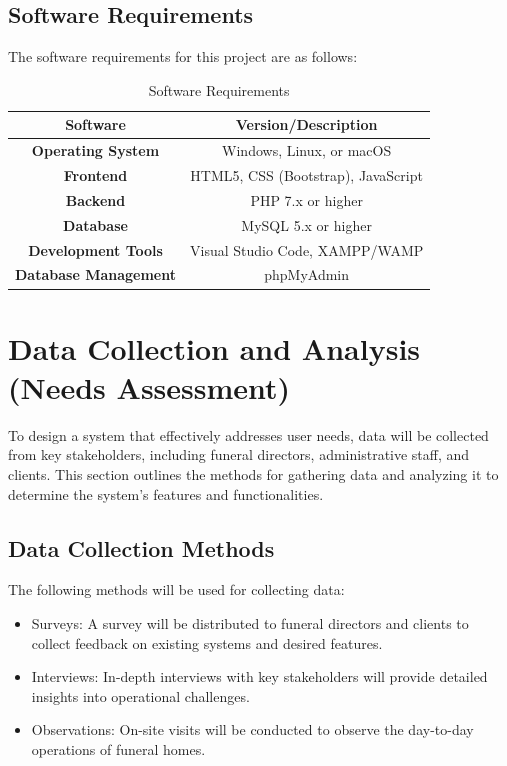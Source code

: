 \documentclass[a4paper,12pt]{report}
\begin{document}
\subsection{Software Requirements}
The software requirements for this project are as follows:
\begin{table}[ht]
\centering
\begin{tabular}{|c|c|}
\hline
\textbf{Software} & \textbf{Version/Description} \\
\hline
\textbf{Operating System} & Windows, Linux, or macOS \\
\textbf{Frontend} & HTML5, CSS (Bootstrap), JavaScript \\
\textbf{Backend} & PHP 7.x or higher \\
\textbf{Database} & MySQL 5.x or higher \\
\textbf{Development Tools} & Visual Studio Code, XAMPP/WAMP \\
\textbf{Database Management} & phpMyAdmin \\
\hline
\end{tabular}
\caption{Software Requirements}
\label{tab:software_requirements}
\end{table}

\section{Data Collection and Analysis (Needs Assessment)}
To design a system that effectively addresses user needs, data will be collected from key stakeholders, including funeral directors, administrative staff, and clients. This section outlines the methods for gathering data and analyzing it to determine the system's features and functionalities.

\subsection{Data Collection Methods}
The following methods will be used for collecting data:
\begin{itemize}
    \item Surveys: A survey will be distributed to funeral directors and clients to collect feedback on existing systems and desired features.
    \item Interviews: In-depth interviews with key stakeholders will provide detailed insights into operational challenges.
    \item Observations: On-site visits will be conducted to observe the day-to-day operations of funeral homes.
\end{itemize}
\end{document}
